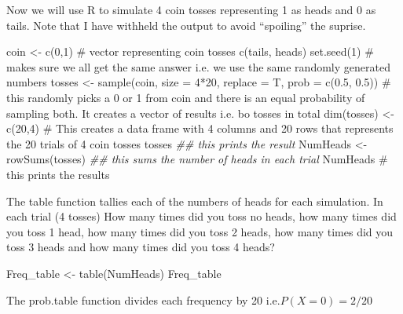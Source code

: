\documentclass[
  10pt,
  letterpaper,
  DIV=11,
  numbers=noendperiod]{scrartcl}
\newenvironment{Shaded}{\begin{snugshade}}{\end{snugshade}}
\newcommand{\AttributeTok}[1]{\textcolor[rgb]{0.40,0.45,0.13}{#1}}
\newcommand{\CommentTok}[1]{\textcolor[rgb]{0.37,0.37,0.37}{#1}}
\newcommand{\DecValTok}[1]{\textcolor[rgb]{0.68,0.00,0.00}{#1}}
\newcommand{\DocumentationTok}[1]{\textcolor[rgb]{0.37,0.37,0.37}{\textit{#1}}}
\newcommand{\FloatTok}[1]{\textcolor[rgb]{0.68,0.00,0.00}{#1}}
\newcommand{\FunctionTok}[1]{\textcolor[rgb]{0.28,0.35,0.67}{#1}}
\newcommand{\NormalTok}[1]{\textcolor[rgb]{0.00,0.23,0.31}{#1}}
\newcommand{\OtherTok}[1]{\textcolor[rgb]{0.00,0.23,0.31}{#1}}
\newcommand{\SpecialCharTok}[1]{\textcolor[rgb]{0.37,0.37,0.37}{#1}}
\begin{document}
Now we will use R to simulate 4 coin tosses representing 1 as heads and
0 as tails. Note that I have withheld the output to avoid ``spoiling''
the suprise.

\begin{Shaded}
\begin{Highlighting}[]
\NormalTok{coin }\OtherTok{\textless{}{-}} \FunctionTok{c}\NormalTok{(}\DecValTok{0}\NormalTok{,}\DecValTok{1}\NormalTok{) }\CommentTok{\# vector representing coin tosses c(tails, heads)}
\FunctionTok{set.seed}\NormalTok{(}\DecValTok{1}\NormalTok{) }\CommentTok{\# makes sure we all get the same answer i.e. we use the same randomly generated numbers}
\NormalTok{tosses }\OtherTok{\textless{}{-}} \FunctionTok{sample}\NormalTok{(coin, }\AttributeTok{size =} \DecValTok{4}\SpecialCharTok{*}\DecValTok{20}\NormalTok{, }\AttributeTok{replace =}\NormalTok{ T, }\AttributeTok{prob =} \FunctionTok{c}\NormalTok{(}\FloatTok{0.5}\NormalTok{, }\FloatTok{0.5}\NormalTok{)) }\CommentTok{\# this randomly picks a 0 or 1 from coin and there is an equal probability of sampling both. It creates a vector of results i.e. bo tosses in total}
\FunctionTok{dim}\NormalTok{(tosses) }\OtherTok{\textless{}{-}} \FunctionTok{c}\NormalTok{(}\DecValTok{20}\NormalTok{,}\DecValTok{4}\NormalTok{) }\CommentTok{\# This creates a data frame with 4 columns and 20 rows that represents the 20 trials of 4 coin tosses}
\NormalTok{tosses }\DocumentationTok{\#\# this prints the result}
\NormalTok{NumHeads }\OtherTok{\textless{}{-}} \FunctionTok{rowSums}\NormalTok{(tosses) }\DocumentationTok{\#\# this sums the number of heads in each trial}
\NormalTok{NumHeads }\CommentTok{\# this prints the results  }
\end{Highlighting}
\end{Shaded}

The table function tallies each of the numbers of heads for each
simulation. In each trial (4 tosses) How many times did you toss no
heads, how many times did you toss 1 head, how many times did you toss 2
heads, how many times did you toss 3 heads and how many times did you
toss 4 heads?

\begin{Shaded}
\begin{Highlighting}[]
\NormalTok{Freq\_table }\OtherTok{\textless{}{-}} \FunctionTok{table}\NormalTok{(NumHeads)}
\NormalTok{Freq\_table}
\end{Highlighting}
\end{Shaded}

The prob.table function divides each frequency by 20 i.e.\(P(X=0)=2/20\)
\end{document}
